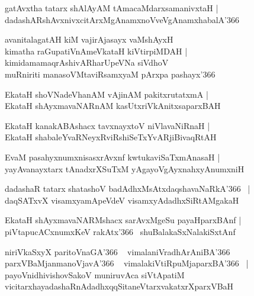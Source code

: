 \documentclass[twoside,12pt,openright]{book}
\newcounter{shloka}[chapter]
\begin{document}
\begin{shloka}%
gatAvxtha tatarx shAlAyAM tAmacaMdarxsamanivxtaH |\\
dadashARshAvxnivxcitArxMgAnamxnoVveVgAnamxhabalA\char'366
\end{shloka}

\begin{shloka}%
avanitalagatAH kiM vajirAjasayx vaMshAyxH \\
kimatha raGupatiVnAmeVkataH kiVtirpiMDAH |\\
kimidamamaqrAshivARharUpeVNa siVdhoV \\
muRniriti manasoVMtaviRsamxyaM pArxpa pashayx\char'366
\end{shloka}

\begin{shloka}%
EkataH shoVNadeVhanAM vAjinAM pakitxrutatxmA |\\
EkataH shAyxmavaNARnAM kasUtxriVkAnitxsaparxBAH 
\end{shloka}

\begin{shloka}%
EkataH kanakABAshacx tavxnayxtoV niVlavaNiRnaH |\\
EkataH shabaleYvaRNeyxRviRshiSeTxYvARjiBivaqRtAH
\end{shloka}

\begin{shloka}%
EvaM pasahyxnumxnisasxrAvxnf kwtukaviSaTxmAnasaH |\\
yayAvanayxtarx tAnadxrXSuTxM yAgayoVgAyxnahxyAnumxniH
\end{shloka}

\begin{shloka}%
dadashaR tatarx shatashoV badAdhxMsAtxdaqshavaNaRkA\char'366 ~|\\
daqSATxvX visamxyamApeVdeV visamxyAdadhxSiRtAMgakaH 
\end{shloka}

\begin{shloka}%
EkataH shAyxmavaNARMshacx sarAvxMgeSu payaHparxBAnf |\\
piVtapucACxnumxKeV rakAtx\char'366 ~shuBalakaSxNalakiSxtAnf
\end{shloka}

\begin{shloka}%
niriVkaSxyX paritoVnaGA\char'366 ~ vimalaniVradhArAniBA\char'366 ~\\
parxVBaMjanmanoVjavA\char'366 ~ vimalakiVtiRpuMjaparxBA\char'366 ~|\\
payoVnidhivishovSakoV muniruvAca siVtApatiM \\
vicitarxhayadashaRnAdadhxqqSitaneVtarxvakatxrXparxVBaH
\end{shloka}
\end{document}
